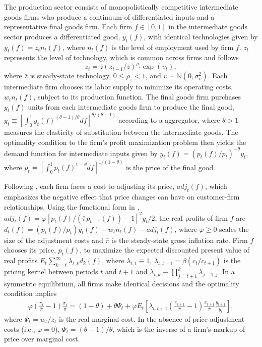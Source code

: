 \documentclass[12pt,final]{article}
\begin{document}
The production sector consists of monopolistically competitive intermediate goods firms who produce a continuum of differentiated inputs and a representative final goods firm. Each firm $f\in[0,1]$ in the intermediate goods sector produces a differentiated good, $y_t(f)$, with identical technologies given by $y_t(f)=z_tn_t(f)$, where $n_t(f)$ is the level of employment used by firm $f$. $z_t$ represents the level of technology, which is common across firms and follows
\begin{equation}
  z_t=\bar{z}(z_{t-1}/\bar{z})^{\rho_z}\exp(\upsilon_t), \label{technology process}
\end{equation}
where $\bar{z}$ is steady-state technology, $0\leq\rho_z<1$, and $\upsilon\sim\mathbb{N}(0,\sigma_\upsilon^2)$. Each intermediate firm chooses its labor supply to minimize its operating costs, $w_tn_t(f)$, subject to its production function. The final goods firm purchases $y_t(f)$ units from each intermediate goods firm to produce the final good, $y_t\equiv[\int_0^1y_t(f)^{(\theta-1)/\theta}df]^{\theta/(\theta-1)}$ according to a \citet{DixitStiglitz1977} aggregator, where $\theta>1$ measures the elasticity of substitution between the intermediate goods. The optimality condition to the firm's profit maximization problem then yields the demand function for intermediate inputs given by $y_t(f)=(p_t(f)/p_t)^{-\theta}y_t$, where $p_t=[\int_0^1p_t(f)^{1-\theta}df]^{1/(1-\theta)}$ is the price of the final good.

Following \citet{Rotemberg1982}, each firm faces a cost to adjusting its price, $adj_t(f)$, which emphasizes the negative effect that price changes can have on customer-firm relationships. Using the functional form in \citet{Ireland1997}, $adj_t(f) = \varphi[p_t(f)/(\bar{\pi} p_{t-1}(f))-1]^2y_t/2$, the real profits of firm $f$ are $d_t(f)=(p_t(f)/p_t)y_t(f)-w_tn_t(f)-adj_t(f)$, where $\varphi\geq0$ scales the size of the adjustment costs and $\bar{\pi}$ is the steady-state gross inflation rate. Firm $f$ chooses its price, $p_t(f)$, to maximize the expected discounted present value of real profits $E_t\sum_{k=t}^{\infty}\lambda_{t,k}d_k(f)$, where $\lambda_{t,t}\equiv1$, $\lambda_{t,t+1}=\beta(c_t/c_{t+1})$ is the pricing kernel between periods $t$ and $t+1$ and $\lambda_{t,k}\equiv\prod_{j=t+1}^{k}\lambda_{j-1,j}$. In a symmetric equilibrium, all firms make identical decisions and the optimality condition implies
\begin{gather}
  \varphi\left(\frac{\pi_t}{\bar{\pi}}-1\right)\frac{\pi_t}{\bar{\pi}} = (1-\theta) + \theta \Psi_t + \varphi E_t\left[\lambda_{t,t+1}\left(\frac{\pi_{t+1}}{\bar{\pi}}-1\right)\frac{\pi_{t+1}}{\bar{\pi}}\frac{y_{t+1}}{y_t}\right], \label{firm pricing}
\end{gather}
where $\Psi_t=w_t/z_t$ is the real marginal cost. In the absence of price adjustment costs (i.e., $\varphi=0$), $\Psi_t=(\theta-1)/\theta $, which is the inverse of a firm's markup of price over marginal cost.
\end{document}
